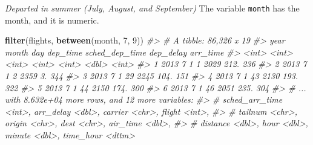 \documentclass[]{book}
\newenvironment{Shaded}{\begin{snugshade}}{\end{snugshade}}
\newcommand{\CommentTok}[1]{\textcolor[rgb]{0.56,0.35,0.01}{\textit{#1}}}
\newcommand{\DecValTok}[1]{\textcolor[rgb]{0.00,0.00,0.81}{#1}}
\newcommand{\KeywordTok}[1]{\textcolor[rgb]{0.13,0.29,0.53}{\textbf{#1}}}
\newcommand{\NormalTok}[1]{#1}
\newcommand{\OperatorTok}[1]{\textcolor[rgb]{0.81,0.36,0.00}{\textbf{#1}}}
\newcommand{\StringTok}[1]{\textcolor[rgb]{0.31,0.60,0.02}{#1}}
\theoremstyle{definition}
\theoremstyle{definition}
\theoremstyle{definition}
\theoremstyle{remark}
\begin{document}
\begin{Shaded}
\end{Shaded}

\emph{Departed in summer (July, August, and September)} The variable
\texttt{month} has the month, and it is numeric.

\begin{Shaded}
\begin{Highlighting}[]
\KeywordTok{filter}\NormalTok{(flights, }\KeywordTok{between}\NormalTok{(month, }\DecValTok{7}\NormalTok{, }\DecValTok{9}\NormalTok{))}
\CommentTok{#> # A tibble: 86,326 x 19}
\CommentTok{#>    year month   day dep_time sched_dep_time dep_delay arr_time}
\CommentTok{#>   <int> <int> <int>    <int>          <int>     <dbl>    <int>}
\CommentTok{#> 1  2013     7     1        1           2029      212.      236}
\CommentTok{#> 2  2013     7     1        2           2359        3.      344}
\CommentTok{#> 3  2013     7     1       29           2245      104.      151}
\CommentTok{#> 4  2013     7     1       43           2130      193.      322}
\CommentTok{#> 5  2013     7     1       44           2150      174.      300}
\CommentTok{#> 6  2013     7     1       46           2051      235.      304}
\CommentTok{#> # ... with 8.632e+04 more rows, and 12 more variables:}
\CommentTok{#> #   sched_arr_time <int>, arr_delay <dbl>, carrier <chr>, flight <int>,}
\CommentTok{#> #   tailnum <chr>, origin <chr>, dest <chr>, air_time <dbl>,}
\CommentTok{#> #   distance <dbl>, hour <dbl>, minute <dbl>, time_hour <dttm>}
\end{Highlighting}
\end{Shaded}
\end{document}
